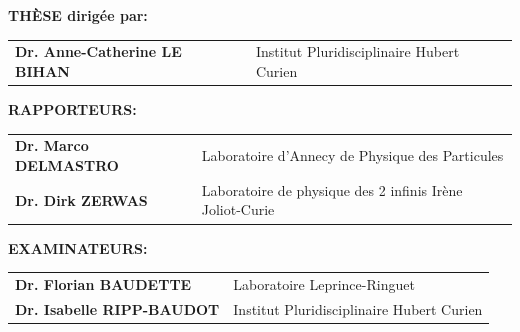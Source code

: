 \begin{titlepage}
\begin{center}
      \end{center}
      
       \small
      
       \vspace*{0.2cm}
      
       {\large \textbf{THÈSE dirigée par:}} %
      
       \vspace*{0.5cm}
      
       \setlength{\tabcolsep}{1cm}
       \begin{tabular}{ll}
             \textbf{Dr. Anne-Catherine LE BIHAN}          & Institut Pluridisciplinaire Hubert Curien\\
       \end{tabular}
      
       \hrulefill
      
       \vspace*{0.5cm}
      
      
      
      
             {\large \textbf{RAPPORTEURS:}} %
      
             \vspace*{0.5cm}
      
             \setlength{\tabcolsep}{.8cm}
             \begin{tabular}{ll}
                   \textbf{Dr. Marco DELMASTRO} & Laboratoire d'Annecy de Physique des Particules\\
                   \textbf{Dr. Dirk ZERWAS} & Laboratoire de physique des 2 infinis Irène Joliot-Curie \\
             \end{tabular}
      
             \vspace*{0.8cm}
      
             {\large \textbf{EXAMINATEURS:}} %
      
             \vspace*{0.5cm}
      
             \setlength{\tabcolsep}{0.72cm}
             \begin{tabular}{ll}
                  \textbf{Dr. Florian BAUDETTE}          &  Laboratoire Leprince-Ringuet\\
                  \textbf{Dr. Isabelle RIPP-BAUDOT}          & Institut Pluridisciplinaire Hubert Curien\\

             \end{tabular}
      
      
      
      \end{titlepage}